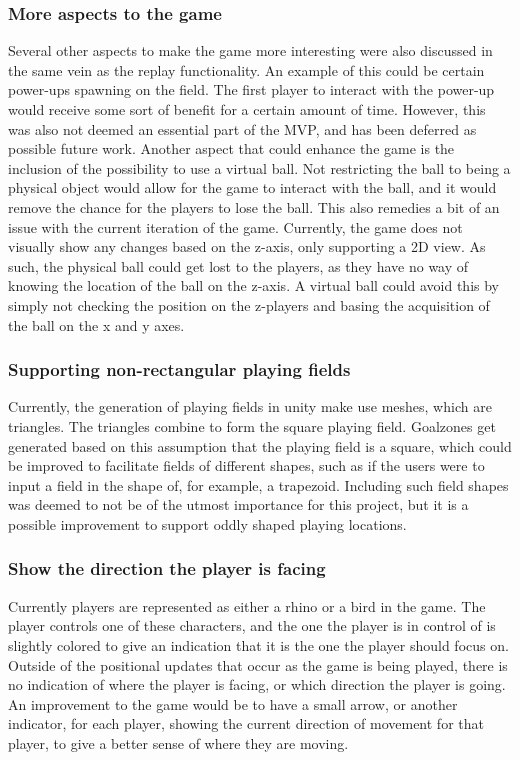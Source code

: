 \subsubsection{More aspects to the game}
Several other aspects to make the game more interesting were also discussed in the same vein as the replay functionality.
An example of this could be certain power-ups spawning on the field.
The first player to interact with the power-up would receive some sort of benefit for a certain amount of time.
However, this was also not deemed an essential part of the MVP, and has been deferred as possible future work.
Another aspect that could enhance the game is the inclusion of the possibility to use a virtual ball.
Not restricting the ball to being a physical object would allow for the game to interact with the ball, and it would remove the chance for the players to lose the ball.
This also remedies a bit of an issue with the current iteration of the game.
Currently, the game does not visually show any changes based on the z-axis, only supporting a 2D view.
As such, the physical ball could get lost to the players, as they have no way of knowing the location of the ball on the z-axis.
A virtual ball could avoid this by simply not checking the position on the z-players and basing the acquisition of the ball on the x and y axes. 

\subsubsection{Supporting non-rectangular playing fields}
Currently, the generation of playing fields in unity make use meshes, which are triangles.
The triangles combine to form the square playing field.
Goalzones get generated based on this assumption that the playing field is a square, which could be improved to facilitate fields of different shapes, such as if the users were to input a field in the shape of, for example, a trapezoid.
Including such field shapes was deemed to not be of the utmost importance for this project, but it is a possible improvement to support oddly shaped playing locations.

\subsubsection{Show the direction the player is facing}
Currently players are represented as either a rhino or a bird in the game.
The player controls one of these characters, and the one the player is in control of is slightly colored to give an indication that it is the one the player should focus on.
Outside of the positional updates that occur as the game is being played, there is no indication of where the player is facing, or which direction the player is going.
An improvement to the game would be to have a small arrow, or another indicator, for each player, showing the current direction of movement for that player, to give a better sense of where they are moving.